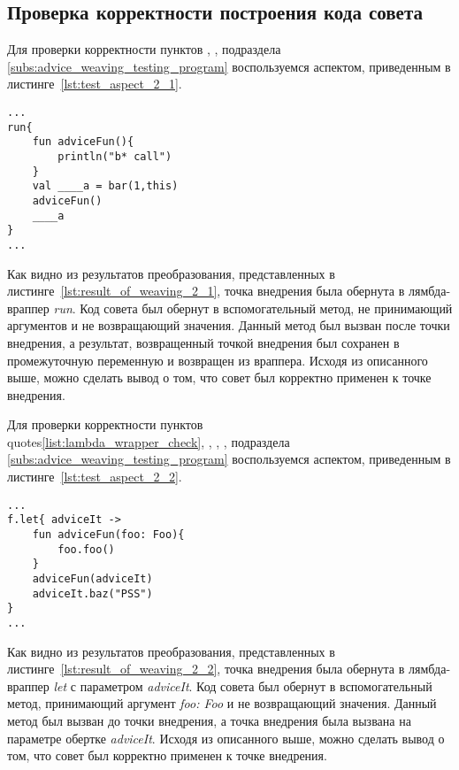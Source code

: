 \subsection{Проверка корректности построения кода совета}
\label{sub:advice_code_building_tests}
Для проверки корректности пунктов \quotes{\ref{list:lambda_wrapper_check}},
\quotes{\ref{list:buffer_method_check}},
\quotes{\ref{list:pointcut_call_check}} подраздела \ref{subs:advice_weaving_testing_program} воспользуемся аспектом, приведенным в листинге~\ref{lst:test_aspect_2_1}.
\begin{lstlisting}[style={java}, label={lst:result_of_weaving_2_1},
 caption={Результат применения аспекта, описанного в листинге~\ref{lst:test_aspect_2_1}, к тестовой программе}]
...
run{
	fun adviceFun(){
        println("b* call")
    }
	val ____a = bar(1,this)
	adviceFun()
	____a
}
...
\end{lstlisting}
Как видно из результатов преобразования, представленных в листинге~\ref{lst:result_of_weaving_2_1}, точка внедрения была обернута в лямбда-враппер \textit{run}.
Код совета был обернут в вспомогательный метод, не принимающий аргументов и не возвращающий значения.
Данный метод был вызван после точки внедрения, а результат, возвращенный точкой внедрения был сохранен в промежуточную переменную и возвращен из враппера.
Исходя из описанного выше, можно сделать вывод о том, что совет был корректно применен к точке внедрения.

Для проверки корректности пунктов \\quotes{\ref{list:lambda_wrapper_check}},
\quotes{\ref{list:buffer_method_check}},
\quotes{\ref{list:buffer_method_call_check}},
\quotes{\ref{list:pointcut_call_check}},
\quotes{\ref{list:target_use_check}} подраздела \ref{subs:advice_weaving_testing_program} воспользуемся аспектом, приведенным в листинге~\ref{lst:test_aspect_2_2}.
\begin{lstlisting}[style={java}, label={lst:result_of_weaving_2_2},
 caption={Результат применения аспекта, описанного в листинге~\ref{lst:test_aspect_2_2}, к тестовой программе}]
...
f.let{ adviceIt ->
	fun adviceFun(foo: Foo){
    	foo.foo()
    }
	adviceFun(adviceIt)
	adviceIt.baz("PSS")
}
...
\end{lstlisting}
Как видно из результатов преобразования, представленных в листинге~\ref{lst:result_of_weaving_2_2}, точка внедрения была обернута в лямбда-враппер \textit{let} с параметром \textit{adviceIt}.
Код совета был обернут в вспомогательный метод, принимающий аргумент \textit{foo: Foo} и не возвращающий значения.
Данный метод был вызван до точки внедрения, а точка внедрения была вызвана на параметре обертке \textit{adviceIt}.
Исходя из описанного выше, можно сделать вывод о том, что совет был корректно применен к точке внедрения.
